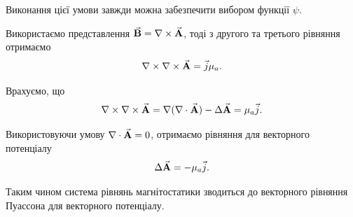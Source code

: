\begin{remark}
	Виконання цієї умови завжди можна забезпечити вибором функції $\psi$.
\end{remark}

Використаємо представлення ${\vec{\mathbf{B}}} = \nabla \times {\vec{\mathbf{A}}}$, тоді з другого та третього рівняння отримаємо
\begin{equation}
	\nabla \times \nabla \times {\vec{\mathbf{A}}} = \vec j \mu_a.	
\end{equation}

Врахуємо, що
\begin{equation}
	\nabla \times \nabla \times {\vec{\mathbf{A}}} = \nabla (\nabla \cdot {\vec{\mathbf{A}}})	- \Delta {\vec{\mathbf{A}}} = \mu_a \vec j.
\end{equation}

Використовуючи умову $\nabla \cdot {\vec{\mathbf{A}}} = 0$, отримаємо рівняння для векторного потенціалу
\begin{equation}
	\Delta {\vec{\mathbf{A}}} = - \mu_a \vec j.	
\end{equation}

Таким чином система рівнянь магнітостатики зводиться до векторного рівняння Пуассона для векторного потенціалу.

